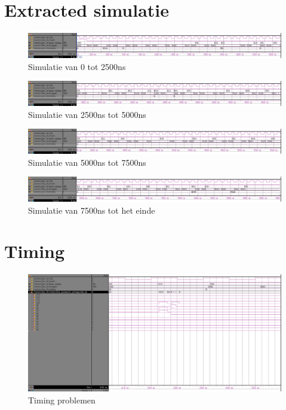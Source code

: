 \section{Extracted simulatie}
\begin{figure}[ht!]
\includegraphics[width=\textwidth,height=\textheight,keepaspectratio]{Figuren/Controller/wave0-2_5_ext_inv.jpg}
\caption{Simulatie van 0 tot 2500ns}
\label{fig:sim_ext_0-2_5}
\end{figure}
\begin{figure}[ht!]
\includegraphics[width=\textwidth,height=\textheight,keepaspectratio]{Figuren/Controller/wave2_5-5_ext_inv.jpg}
\caption{Simulatie van 2500ns tot 5000ns}
\label{fig:sim_ext_2_5-5}
\end{figure}
\begin{figure}[ht!]
\includegraphics[width=\textwidth,height=\textheight,keepaspectratio]{Figuren/Controller/wave5-7_5_ext_inv.jpg}
\caption{Simulatie van 5000ns tot 7500ns}
\label{fig:sim_ext_5-7_5}
\end{figure}
\begin{figure}[ht!]
\includegraphics[width=\textwidth,height=\textheight,keepaspectratio]{Figuren/Controller/wave7_5-_ext_inv.jpg}
\caption{Simulatie van 7500ns tot het einde}
\label{fig:sim_ext_7_5-}
\end{figure}
\newpage
\section{Timing}
\begin{figure}[ht!]
\includegraphics[width=\textwidth,height=\textheight,keepaspectratio]{Figuren/Controller/gliches_min_inv.jpg}
\caption{Timing problemen}
\label{fig:timing_controller}
\end{figure}

